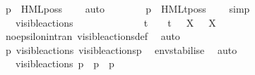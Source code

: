 \begin{isabellebody}
\ {\isacartoucheopen}{\isasymtheta}{\isacharparenleft}{\kern0pt}p{\isacharparenright}{\kern0pt}\ {\isasymTurnstile}\ HML{\isacharunderscore}{\kern0pt}poss\ {\isasymtau}\ {\isasymsigma}{\isacharparenleft}{\kern0pt}{\isasymphi}{\isacharparenright}{\kern0pt}{\isacartoucheclose}\ \isamarkupfalse%
\ auto\isanewline
\ \ \ \ \ \ \isamarkupfalse%
\ {\isacartoucheopen}{\isasymtheta}{\isacharparenleft}{\kern0pt}p{\isacharparenright}{\kern0pt}\ {\isasymTurnstile}\ {\isasymsigma}{\isacharparenleft}{\kern0pt}HMLt{\isacharunderscore}{\kern0pt}poss\ {\isasymtau}\ {\isasymphi}{\isacharparenright}{\kern0pt}{\isacartoucheclose}\ \isamarkupfalse%
\ simp\isanewline
\ \ \ \ \isamarkupfalse%
\isanewline
\ \ \ \ \ \ \isamarkupfalse%
\ {\isacartoucheopen}{\isasymalpha}\ {\isasymin}\ visible{\isacharunderscore}{\kern0pt}actions{\isacartoucheclose}\isanewline
\ \ \ \ \ \ \isamarkupfalse%
\ {\isacartoucheopen}{\isasymalpha}\ {\isasymnoteq}\ {\isasymtau}\ {\isasymand}\ {\isasymalpha}\ {\isasymnoteq}\ t\ {\isasymand}\ {\isasymalpha}\ {\isasymnoteq}\ t{\isacharunderscore}{\kern0pt}{\isasymepsilon}\ {\isasymand}\ {\isacharparenleft}{\kern0pt}{\isasymforall}\ X{\isachardot}{\kern0pt}\ {\isasymalpha}\ {\isasymnoteq}\ {\isasymepsilon}{\isacharbrackleft}{\kern0pt}X{\isacharbrackright}{\kern0pt}{\isacharparenright}{\kern0pt}{\isacartoucheclose}\ \isanewline
\ \ \ \ \ \ \ \ \isamarkupfalse%
\ no{\isacharunderscore}{\kern0pt}epsilon{\isacharunderscore}{\kern0pt}in{\isacharunderscore}{\kern0pt}tran\ visible{\isacharunderscore}{\kern0pt}actions{\isacharunderscore}{\kern0pt}def\ \isamarkupfalse%
\ auto\isanewline
\ \ \ \ \ \ \isamarkupfalse%
\ {\isacartoucheopen}{\isasymtheta}{\isacharparenleft}{\kern0pt}p{\isacharparenright}{\kern0pt}\ {\isasymlongmapsto}\isactrlsup {\isasymtheta}{\isasymepsilon}{\isacharbrackleft}{\kern0pt}visible{\isacharunderscore}{\kern0pt}actions{\isacharbrackright}{\kern0pt}\ {\isasymtheta}{\isacharbrackleft}{\kern0pt}visible{\isacharunderscore}{\kern0pt}actions{\isacharbrackright}{\kern0pt}{\isacharparenleft}{\kern0pt}p{\isacharparenright}{\kern0pt}{\isacartoucheclose}\ \isamarkupfalse%
\ env{\isacharunderscore}{\kern0pt}stabilise\ \isamarkupfalse%
\ auto\isanewline
\ \ \ \ \ \ \isamarkupfalse%
\ \isamarkupfalse%
\ {\isacartoucheopen}{\isasymalpha}\ {\isasymin}\ visible{\isacharunderscore}{\kern0pt}actions{\isacartoucheclose}\ {\isacartoucheopen}p\ {\isasymlongmapsto}{\isasymalpha}\ p{\isacharprime}{\kern0pt}\ {\isasymand}\ p{\isacharprime}{\kern0pt}\ {\isasymTTurnstile}\ {\isasymphi}{\isacartoucheclose}\ \isanewline

\end{isabellebody}
